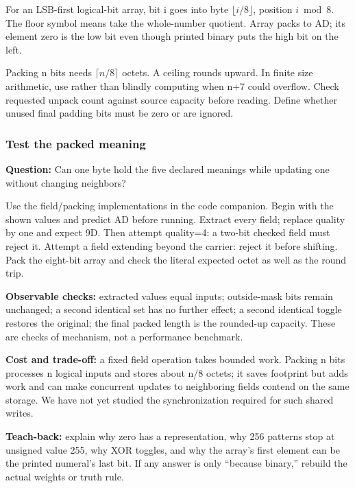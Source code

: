 For an LSB-first logical-bit array, bit i goes into byte \(\lfloor i/8\rfloor\), position \(i\bmod8\). The floor symbol means take the whole-number quotient. Array \BookInlineCode{{[}1,0,1,1,0,1,0,1{]}} packs to AD; its element zero is the low bit even though printed binary puts the high bit on the left.

Packing n bits needs \(\lceil n/8\rceil\) octets. A ceiling rounds upward. In finite size arithmetic, use  rather than blindly computing  when n+7 could overflow. Check requested unpack count against source capacity before reading. Define whether unused final padding bits must be zero or are ignored.

\subsubsection{Test the packed meaning}\label{01-foundations-i-ch001-test-the-packed-meaning}

\hypertarget{01-foundations-i-ch001-test-the-packed-meaning}{}

\textbf{Question:} Can one byte hold the five declared meanings while updating one without changing neighbors?

Use the field/packing implementations in the code companion. Begin with the shown values and predict AD before running. Extract every field; replace quality by one and expect 9D. Then attempt quality=4: a two-bit checked field must reject it. Attempt a field extending beyond the carrier: reject it before shifting. Pack the eight-bit array and check the literal expected octet as well as the round trip.

\textbf{Observable checks:} extracted values equal inputs; outside-mask bits remain unchanged; a second identical set has no further effect; a second identical toggle restores the original; the final packed length is the rounded-up capacity. These are checks of mechanism, not a performance benchmark.

\textbf{Cost and trade-off:} a fixed field operation takes bounded work. Packing n bits processes n logical inputs and stores about n/8 octets; it saves footprint but adds work and can make concurrent updates to neighboring fields contend on the same storage. We have not yet studied the synchronization required for such shared writes.

\textbf{Teach-back:} explain why zero has a representation, why 256 patterns stop at unsigned value 255, why XOR toggles, and why the array's first element can be the printed numeral's last bit. If any answer is only ``because binary,'' rebuild the actual weights or truth rule.

